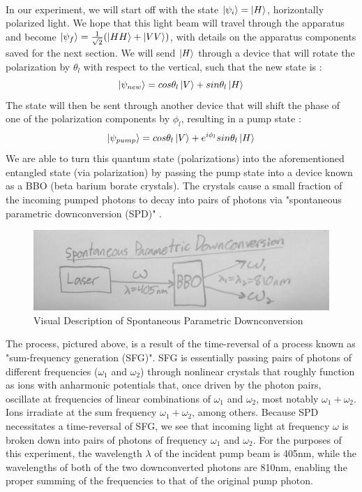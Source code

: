 \documentclass{article}
\begin{document}
    \\\indent In our experiment, we will start off with the state $\left\vert{\psi_i}\right\rangle = \left\vert{H}\right\rangle$, horizontally polarized light. We hope that this light beam will travel through the apparatus and become $\left\vert{\psi_f}\right\rangle = \frac{1}{\sqrt{2}}(\left\vert{HH}\right\rangle + \left\vert{VV}\right\rangle)$, with details on the apparatus components saved for the next section. We will send $\left\vert{H}\right\rangle$ through a device that will rotate the polarization by $\theta_l$ with respect to the vertical, such that the new state is \cite{vaz}:
    \begin{equation}
        \left\vert{\psi_{new}}\right\rangle = cos\theta_l\left\vert{V}\right\rangle + sin\theta_l\left\vert{H}\right\rangle
    \end{equation} The state will then be sent through another device that will shift the phase of one of the polarization components by $\phi_l$, resulting in a pump state \cite{deh}: \begin{equation}
        \left\vert{\psi_{pump}}\right\rangle = cos\theta_l\left\vert{V}\right\rangle + e^{i\phi_l}sin\theta_l\left\vert{H}\right\rangle
    \end{equation}
    We are able to turn this quantum state (polarizations) into the aforementioned entangled state (via polarization) by passing the pump state into a device known as a BBO (beta barium borate crystals). The crystals cause a small fraction of the incoming pumped photons to decay into pairs of photons via "spontaneous parametric downconversion (SPD)" \cite{deh}. 
    \begin{figure}[H] %
    \centering
    \includegraphics[scale = 0.15]{7.JPG}
    \caption{Visual Description of Spontaneous Parametric Downconversion}
    \label{fig:my_label}
\end{figure}
    The process, pictured above, is a result of the time-reversal of a process known as "sum-frequency generation (SFG)". SFG is essentially passing pairs of photons of different frequencies ($\omega_1$ and $\omega_2$) through nonlinear crystals that roughly function as ions with anharmonic potentials that, once driven by the photon pairs, oscillate at frequencies of linear combinations of $\omega_1$ and $\omega_2$, most notably $\omega_1 + \omega_2$. Ions irradiate at the sum frequency $\omega_1 + \omega_2$, among others. Because SPD necessitates a time-reversal of SFG, we see that incoming light at frequency $\omega$ is broken down into pairs of photons of frequency $\omega_1$ and $\omega_2$. For the purposes of this experiment, the wavelength $\lambda$ of the incident pump beam is 405nm, while the wavelengths of both of the two downconverted photons are 810nm, enabling the proper summing of the frequencies to that of the original pump photon. \cite{deh} 
    
\end{document}
